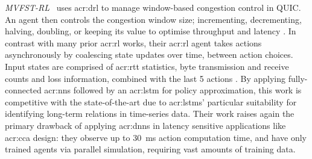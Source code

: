\emph{MVFST-RL}~\parencite{DBLP:journals/corr/abs-1910-04054} uses \gls{acr:drl} to manage window-based congestion control in QUIC.
An agent then controls the congestion window size; incrementing, decrementing, halving, doubling, or keeping its value \prllitact{} to optimise throughput and latency \prllitreward.
In contrast with many prior \gls{acr:rl} works, their \gls{acr:rl} agent takes actions asynchronously by coalescing state updates over time, between action choices.
Input states are comprised of \gls{acr:rtt} statistics, byte transmission and receive counts and loss information, combined with the last \num{5} actions \prllitstate.
By applying fully-connected \glspl{acr:nn} followed by an \gls{acr:lstm} for policy approximation, this work is competitive with the state-of-the-art due to \glspl{acr:lstm}' particular suitability for identifying long-term relations in time-series data.
Their work raises again the primary drawback of applying \glspl{acr:dnn} in latency sensitive applications like \gls{acr:cca} design: they observe up to \qty{30}{\milli\second} action computation time, and have only trained agents via parallel simulation, requiring vast amounts of training data.

